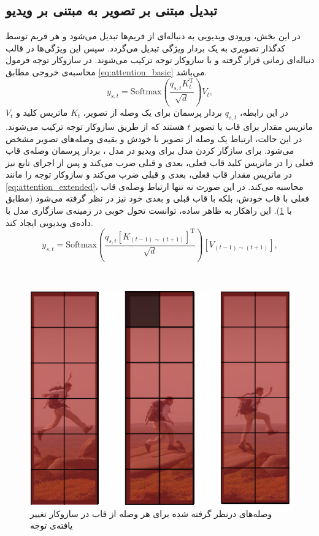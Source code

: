\subsection{تبدیل  مبتنی بر تصویر به  مبتنی بر ویدیو}
در این بخش، ورودی ویدیویی به دنباله‌ای از فریم‌ها تبدیل می‌شود و هر فریم توسط کدگذار تصویری  به یک بردار ویژگی تبدیل می‌گردد. سپس این ویژگی‌ها در قالب دنباله‌ای زمانی قرار گرفته و با سازوکار توجه ترکیب می‌شوند. در سازوکار توجه فرمول محاسبه‌ی خروجی مطابق \eqref{eq:attention_basic} می‌باشد.
\begin{equation}\label{eq:attention_basic}
	y_{s,t} = \mathrm{Softmax}\left( \frac{q_{s,t} K_{t}^{\mathrm{T}}}{\sqrt{d}} \right) V_{t},
\end{equation}
در این رابطه، $q_{s,t}$ بردار پرسمان  برای یک وصله
	 از تصویر، $K_t$ ماتریس کلید و $V_t$ ماتریس مقدار برای قاب یا تصویر $t$ هستند که از طریق سازوکار توجه ترکیب می‌شوند. در این حالت، ارتباط یک وصله از تصویر با خودش و بقیه‌ی وصله‌های تصویر مشخص می‌شود. برای سازگار کردن مدل برای ویدیو در مدل ، بردار پرسمان وصله‌ی قاب فعلی را در ماتریس کلید قاب فعلی، بعدی و قبلی ضرب می‌کند و پس از اجرای تابع  نیز در ماتریس مقدار قاب فعلی، بعدی و قبلی ضرب می‌کند و سازوکار توجه را مانند \eqref{eq:attention_extended}، محاسبه می‌کند. در این صورت نه تنها ارتباط وصله‌ی قاب فعلی با قاب خودش، بلکه با قاب قبلی و بعدی خود نیز در نظر گرفته می‌شود (مطابق با \cref{fig.31}). این راهکار به ظاهر ساده، توانست تحول خوبی در زمینه‌ی سازگاری مدل  با داده‌ی ویدیویی ایجاد کند.
\begin{equation}\label{eq:attention_extended}
	y_{s,t} = \mathrm{Softmax}\left( 
	\frac{q_{s,t} \left[ K_{(t-1)\sim(t+1)} \right]^{\mathrm{T}}}{\sqrt{d}} 
	\right) 
	\left[ V_{(t-1)\sim(t+1)} \right],
\end{equation}

‌\begin{figure}
	\centering\includegraphics[scale=.50]{Images/Chapter3/openvclip_attention.png}
	\caption[]{ وصله‌های درنظر گرفته شده برای هر وصله از قاب در سازوکار تغییر یافته‌ی توجه}
	\label{fig.31}
\end{figure}

